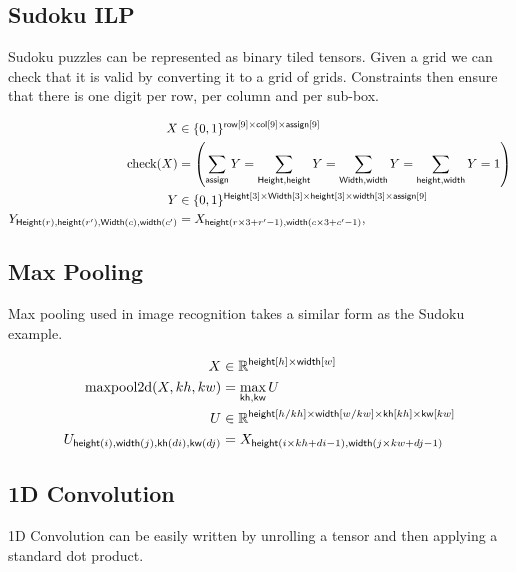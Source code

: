 \documentclass{article}
\newcommand{\reals}{\mathbb{R}}
\begin{document}
\subsection{Sudoku ILP}

Sudoku puzzles can be represented as  binary tiled tensors.
Given a grid we can check that it is valid by converting it to a grid of grids. 
Constraints then ensure that there is one digit per row, per column and per sub-box. 

\begin{align*} 
X &\in \{0, 1\}^{\mathsf{row}[9] \times \mathsf{col}[9] \times \mathsf{assign}[9]}  \\
\text{check}(X) &=
\left(\sum\limits_{\mathsf{assign}} Y = 
\sum\limits_{\mathsf{Height, height}} Y = 
\sum\limits_{\mathsf{Width, width}} Y =  
\sum\limits_{\mathsf{height, width}} Y = 1 \right) \\
Y &\in \{0, 1\}^{\mathsf{Height}[3] \times \mathsf{Width}[3] \times \mathsf{height}[3] \times \mathsf{width}[3] \times \mathsf{assign}[9]}  \\
Y_{\mathsf{Height}(r), \mathsf{height}(r'), \mathsf{Width}(c), \mathsf{width}(c')} &= X_{\mathsf{height}(r\times 3 + r'-1), \mathsf{width}(c\times3 + c'-1)}, 
\end{align*} 


\subsection{Max Pooling}

Max pooling used in image recognition takes a similar form as the Sudoku example.

\begin{align*} 
X &\in \reals^{\nset{height}{h} \times \nset{width}{w}} \\
\text{maxpool2d}(X, kh, kw) &=  \nfun{kh, kw}{max} U \\
U &\in \reals^{{\nset{height}{h / kh} \times \nset{width}{w / kw} \times \nset{kh}{kh} \times \nset{kw}{kw}}} \\
U_{\nidx{height}{i}, \nidx{width}{j}, \nidx{kh}{di}, \nidx{kw}{dj}} & = X_{\nidx{height}{i \times kh + di -1}, \nidx{width}{j \times kw + dj -1}}  
\end{align*}



\subsection{1D Convolution}

1D Convolution can be easily written by unrolling a tensor and then
applying a standard dot product.
\end{document}
